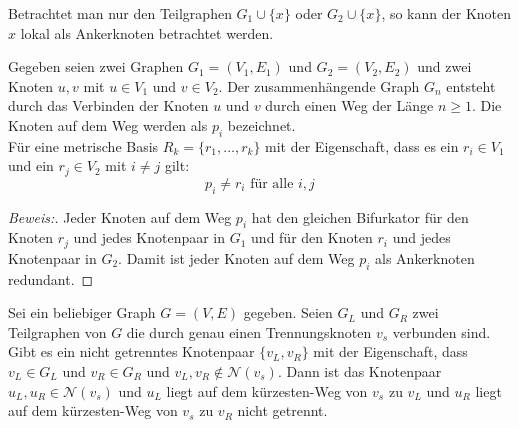 Betrachtet man nur den Teilgraphen $G_1 \cup \{x\}$ oder $G_2 \cup \{x\}$, so kann der Knoten $x$ lokal als Ankerknoten betrachtet werden. 
\begin{lem}
\label{keinknotenvonwegindermd}
Gegeben seien zwei Graphen $G_1=(V_1,E_1)$ und $G_2=(V_2,E_2)$ und zwei Knoten $u,v$ mit $u \in V_1$ und $v \in V_2$.
Der zusammenhängende Graph $G_n$ entsteht durch das Verbinden der Knoten $u$ und $v$ durch einen Weg der Länge $n \geq 1$. Die Knoten auf dem Weg werden als $p_i$ bezeichnet.\\
Für eine metrische Basis $R_k= \{ r_1, \ldots , r_k \}$ mit der Eigenschaft, dass es ein $r_i \in V_1$ und ein $r_j \in V_2$  mit $i \neq j$ gilt:
\[p_i \neq r_i \text{ für alle } i,j\]
\end{lem}
\begin{proof}[Beweis:]
Jeder Knoten auf dem Weg $p_i$ hat den gleichen Bifurkator für den Knoten $r_j$ und jedes Knotenpaar in $G_1$ und für den Knoten $r_i$ und jedes Knotenpaar in $G_2$. Damit ist jeder Knoten auf dem Weg $p_i$ als Ankerknoten redundant.
\end{proof}
\begin{lem}
\label{nachbartrennungsknoten}
Sei ein beliebiger Graph $G=(V,E)$ gegeben. Seien $G_L$ und $G_R$ zwei Teilgraphen von $G$ die durch genau einen Trennungsknoten $v_s$ verbunden sind. Gibt es ein nicht getrenntes Knotenpaar $\{v_L,v_R\}$ mit der Eigenschaft, dass $v_L\in G_L$ und $v_R \in G_R$ und $v_L, v_R \notin \mathcal{N}(v_s)$.\newline
Dann ist das Knotenpaar $u_L,u_R \in \mathcal{N}(v_s)$ und $u_L$ liegt auf dem kürzesten-Weg von $v_s$ zu $v_L$ und $u_R$ liegt auf dem kürzesten-Weg von $v_s$ zu $v_R$ nicht getrennt.
\end{lem}
